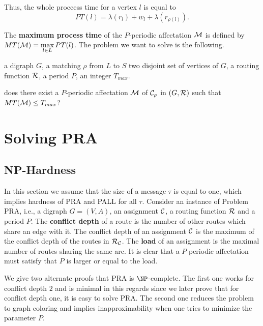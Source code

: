 \documentclass[a4paper,10pt]{article}
\begin{document}
      Thus, the whole proccess time for a vertex $l$ is equal to
      $$
      PT(l)=\lambda(r_l)+ w_l+\lambda(r_{\rho(l)}).
      $$
      
    The {\bf maximum process time} of the $P$-periodic affectation ${\cal M} $ is defined by $MT({\cal M})=\max\limits_{l \in L} PT(l)$. The problem we want to solve is the following. 


        a digraph $G$, a matching $\rho$ from $L$ to $S$ two disjoint set of vertices of $G$, a routing function $\cal R$, a period $P$, an integer $T_{max}$.

       does there exist a $P$-periodic affectation ${\cal M}$ of ${\cal C}_{\rho}$ in $(G,{\cal R})$ such that $MT({\cal M}) \leq T_{max}$?



	

  
\section{Solving PRA}
  \label{sec:complexity}
  \subsection{NP-Hardness}

 In this section we assume that the size of a message $\tau$ is equal to one, which implies hardness of PRA and PALL for all $\tau$. 
Consider an instance of Problem PRA, i.e., a digraph $G=(V,A)$, an assignment $\cal C$, a routing function $\cal R$ and a period $P$. 
The {\bf conflict depth} of a route is the number of other routes which share an edge with it. 
The conflict depth of an assignment $\cal C$ is the maximum of the conflict depth of the routes in ${\cal R}_{\cal C}$.
The {\bf load} of an assignment is the maximal number of routes sharing the same arc.
It is clear that a $P$-periodic affectation must satisfy that $P$ is larger or equal to the load.

We give two alternate proofs that PRA is $\NP$-complete.
The first one works for conflict depth $2$ and is minimal in this regards since we later prove that for conflict depth one,
it is easy to solve PRA. The second one reduces the problem to graph coloring and implies inapproximability when one tries to minimize the parameter $P$. \\
 
\end{document}
